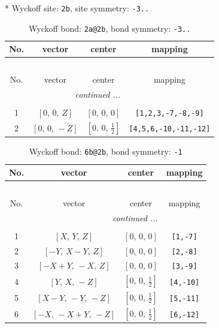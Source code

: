 \documentclass[fleqn,8pt]{jsarticle}
\begin{document}
* Wyckoff site: {\tt 2b}, site symmetry: {\tt -3..}
\renewcommand{\arraystretch}{1.2}
\begin{longtable}{cccc}
\caption{Wyckoff bond: {\tt 2a@2b}, bond symmetry: {\tt -3..}}
 \\
 \hline \hline
No. & vector & center & mapping \\ \hline \endfirsthead

\multicolumn{3}{l}{\tablename\ \thetable{}} \\
 \hline \hline
No. & vector & center & mapping \\ \hline \endhead

 \hline \hline
\multicolumn{3}{r}{\footnotesize\it continued ...} \\ \endfoot

 \hline \hline
\multicolumn{3}{r}{} \\ \endlastfoot

1 & $\left[ 0,\, 0,\, Z \right]$ & $\left[ 0,\, 0,\, 0 \right]$ & {\tt [1,2,3,-7,-8,-9]} \\ \hline
2 & $\left[ 0,\, 0,\, - Z \right]$ & $\left[ 0,\, 0,\, \frac{1}{2} \right]$ & {\tt [4,5,6,-10,-11,-12]} \\
\end{longtable}
\renewcommand{\arraystretch}{1.2}
\begin{longtable}{cccc}
\caption{Wyckoff bond: {\tt 6b@2b}, bond symmetry: {\tt -1}}
 \\
 \hline \hline
No. & vector & center & mapping \\ \hline \endfirsthead

\multicolumn{3}{l}{\tablename\ \thetable{}} \\
 \hline \hline
No. & vector & center & mapping \\ \hline \endhead

 \hline \hline
\multicolumn{3}{r}{\footnotesize\it continued ...} \\ \endfoot

 \hline \hline
\multicolumn{3}{r}{} \\ \endlastfoot

1 & $\left[ X,\, Y,\, Z \right]$ & $\left[ 0,\, 0,\, 0 \right]$ & {\tt [1,-7]} \\ \hline
2 & $\left[ - Y,\, X - Y,\, Z \right]$ & $\left[ 0,\, 0,\, 0 \right]$ & {\tt [2,-8]} \\ \hline
3 & $\left[ - X + Y,\, - X,\, Z \right]$ & $\left[ 0,\, 0,\, 0 \right]$ & {\tt [3,-9]} \\ \hline
4 & $\left[ Y,\, X,\, - Z \right]$ & $\left[ 0,\, 0,\, \frac{1}{2} \right]$ & {\tt [4,-10]} \\ \hline
5 & $\left[ X - Y,\, - Y,\, - Z \right]$ & $\left[ 0,\, 0,\, \frac{1}{2} \right]$ & {\tt [5,-11]} \\ \hline
6 & $\left[ - X,\, - X + Y,\, - Z \right]$ & $\left[ 0,\, 0,\, \frac{1}{2} \right]$ & {\tt [6,-12]} \\
\end{longtable}
\end{document}
